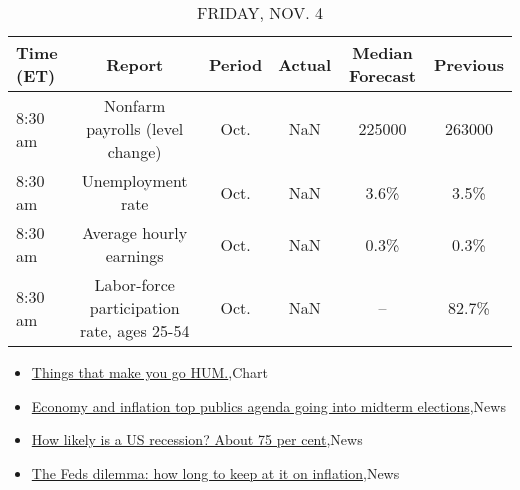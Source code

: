 \documentclass{article}%
\begin{document}
%


\begin{table}[htbp]%
\caption{FRIDAY, NOV. 4}%
\centering%
\begin{adjustbox}{width=1\textwidth}%
\begin{tabular}{lccccc}
\toprule
Time (ET) &                                     Report & Period & Actual & Median Forecast & Previous \\
\midrule
  8:30 am &            Nonfarm payrolls (level change) &   Oct. &    NaN &          225000 &   263000 \\
  8:30 am &                          Unemployment rate &   Oct. &    NaN &            3.6\% &     3.5\% \\
  8:30 am &                    Average hourly earnings &   Oct. &    NaN &            0.3\% &     0.3\% \\
  8:30 am & Labor-force participation rate, ages 25-54 &   Oct. &    NaN &              -- &    82.7\% \\
\bottomrule
\end{tabular}
%
\end{adjustbox}%
\end{table}

%
\begin{itemize}%
\item%
\href{https://reddit.com/r/wallstreetbets/comments/yi9v2g/things\_that\_make\_you\_go\_hum/}{Things that make you go HUM.},Chart%
\item%
\href{https://reddit.com/r/Economics/comments/yi9noc/economy\_and\_inflation\_top\_publics\_agenda\_going/}{Economy and inflation top publics agenda going into midterm elections},News%
\item%
\href{https://reddit.com/r/Economics/comments/yi10d5/how\_likely\_is\_a\_us\_recession\_about\_75\_per\_cent/}{How likely is a US recession? About 75 per cent},News%
\item%
\href{https://reddit.com/r/Economics/comments/yhrhof/the\_feds\_dilemma\_how\_long\_to\_keep\_at\_it\_on/}{The Feds dilemma: how long to keep at it on inflation},News%
\end{itemize}%
\end{document}
